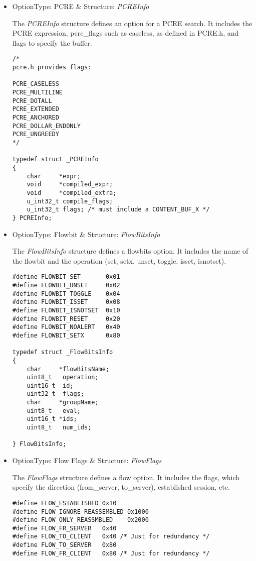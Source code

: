 \documentclass[english]{report}
\begin{document}
\begin{itemize}
\item {OptionType: PCRE \& Structure: {\em PCREInfo}}

The {\em PCREInfo} structure defines an option for a PCRE search.  It includes
the PCRE expression, pcre\_flags such as caseless, as defined in PCRE.h, and
flags to specify the buffer.

\begin{verbatim}
/*
pcre.h provides flags:

PCRE_CASELESS
PCRE_MULTILINE
PCRE_DOTALL
PCRE_EXTENDED
PCRE_ANCHORED
PCRE_DOLLAR_ENDONLY
PCRE_UNGREEDY
*/

typedef struct _PCREInfo
{
    char     *expr;
    void     *compiled_expr;
    void     *compiled_extra;
    u_int32_t compile_flags;
    u_int32_t flags; /* must include a CONTENT_BUF_X */
} PCREInfo;
\end{verbatim}

\item {OptionType: Flowbit \& Structure: {\em FlowBitsInfo}}

The {\em FlowBitsInfo} structure defines a flowbits option.  It includes the
name of the flowbit and the operation (set, setx, unset, toggle, isset, isnotset).

\begin{verbatim}
#define FLOWBIT_SET       0x01
#define FLOWBIT_UNSET     0x02
#define FLOWBIT_TOGGLE    0x04
#define FLOWBIT_ISSET     0x08
#define FLOWBIT_ISNOTSET  0x10
#define FLOWBIT_RESET     0x20
#define FLOWBIT_NOALERT   0x40
#define FLOWBIT_SETX      0x80

typedef struct _FlowBitsInfo
{
    char     *flowBitsName;
    uint8_t   operation;
    uint16_t  id;
    uint32_t  flags;
    char     *groupName;
    uint8_t   eval;
    uint16_t *ids;
    uint8_t   num_ids;
    
} FlowBitsInfo;
\end{verbatim}

\item {OptionType: Flow Flags \& Structure: {\em FlowFlags}}

The {\em FlowFlags} structure defines a flow option.  It includes the flags,
which specify the direction (from\_server, to\_server), established session,
etc. 

\begin{verbatim}
#define FLOW_ESTABLISHED 0x10
#define FLOW_IGNORE_REASSEMBLED 0x1000
#define FLOW_ONLY_REASSMBLED    0x2000
#define FLOW_FR_SERVER   0x40
#define FLOW_TO_CLIENT   0x40 /* Just for redundancy */
#define FLOW_TO_SERVER   0x80
#define FLOW_FR_CLIENT   0x80 /* Just for redundancy */


\end{verbatim}
\end{itemize}
\end{document}
